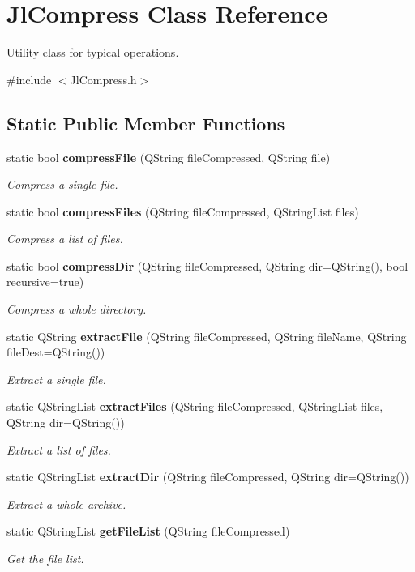\section{JlCompress Class Reference}
\label{classJlCompress}


Utility class for typical operations.  




{\ttfamily \#include $<$JlCompress.h$>$}

\subsection*{Static Public Member Functions}
\begin{DoxyCompactItemize}
\item 
static bool {\bf compressFile} (QString fileCompressed, QString file)
\begin{DoxyCompactList}\small\item\em Compress a single file. \end{DoxyCompactList}\item 
static bool {\bf compressFiles} (QString fileCompressed, QStringList files)
\begin{DoxyCompactList}\small\item\em Compress a list of files. \end{DoxyCompactList}\item 
static bool {\bf compressDir} (QString fileCompressed, QString dir=QString(), bool recursive=true)
\begin{DoxyCompactList}\small\item\em Compress a whole directory. \end{DoxyCompactList}\item 
static QString {\bf extractFile} (QString fileCompressed, QString fileName, QString fileDest=QString())
\begin{DoxyCompactList}\small\item\em Extract a single file. \end{DoxyCompactList}\item 
static QStringList {\bf extractFiles} (QString fileCompressed, QStringList files, QString dir=QString())
\begin{DoxyCompactList}\small\item\em Extract a list of files. \end{DoxyCompactList}\item 
static QStringList {\bf extractDir} (QString fileCompressed, QString dir=QString())
\begin{DoxyCompactList}\small\item\em Extract a whole archive. \end{DoxyCompactList}\item 
static QStringList {\bf getFileList} (QString fileCompressed)
\begin{DoxyCompactList}\small\item\em Get the file list. \end{DoxyCompactList}\end{DoxyCompactItemize}


